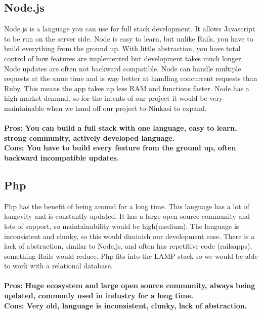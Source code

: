 \documentclass[draftclsnofoot,onecolumn,letterpaper,10pt,compsoc]{IEEEtran}
\begin{document}
	\subsection{Node.js}
			Node.js is a language you can use for full stack development.
			It allows Javascript to be run on the server side.
			Node is easy to learn, but unlike Rails, you have to build everything from the ground up.
			With little abstraction, you have total control of how features are implemented but development takes much longer.
			Node updates are often not backward compatible.
			Node can handle multiple requests at the same time and is way better at handling concurrent requests than Ruby.
			This means the app takes up less RAM and functions faster.
			Node has a high market demand, so for the intents of our project it would be very maintainable when we hand off our project to Ninkasi to expand.
			\\ \\
			\textbf{Pros: You can build a full stack with one language, easy to learn, strong community, actively developed language.}
			\\
			\textbf{Cons: You have to build every feature from the ground up, often backward incompatible updates.}

	\subsection{Php}
	Php has the benefit of being around for a long time\cite{InfoWorldPhp}.
	This language has a lot of longevity and is constantly updated. It has a large open source community and lots of support, so maintainability would be high(medium).
	The language is inconsistent and clunky, so this would diminish our development ease.
	There is a lack of abstraction, similar to Node.js, and often has repetitive code (railsapps), something Rails would reduce.
	Php fits into the LAMP stack so we would be able to work with a relational database.
		\\ \\
		\textbf{Pros: Huge ecosystem and large open source community, always being updated, commonly used in industry for a long time.}
		\\
		\textbf{Cons: Very old, language is inconsistent, clunky, lack of abstraction.}
\end{document}
